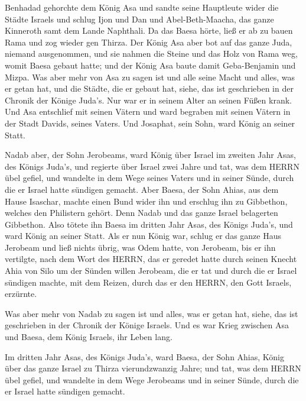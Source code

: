  Benhadad gehorchte dem König Asa und sandte seine
Hauptleute wider die Städte Israels und schlug Ijon und Dan und
Abel-Beth-Maacha, das ganze Kinneroth samt dem Lande Naphthali.
 Da das Baesa hörte, ließ er ab zu bauen Rama und zog
wieder gen Thirza.  Der König Asa aber bot auf das ganze
Juda, niemand ausgenommen, und sie nahmen die Steine und das Holz von
Rama weg, womit Baesa gebaut hatte; und der König Asa baute damit
Geba-Benjamin und Mizpa.  Was aber mehr von Asa zu sagen
ist und alle seine Macht und alles, was er getan hat, und die Städte,
die er gebaut hat, siehe, das ist geschrieben in der Chronik der Könige
Juda's. Nur war er in seinem Alter an seinen Füßen krank. 
Und Asa entschlief mit seinen Vätern und ward begraben mit seinen Vätern
in der Stadt Davids, seines Vaters. Und Josaphat, sein Sohn, ward König
an seiner Statt.

 Nadab aber, der Sohn Jerobeams, ward König über Israel im
zweiten Jahr Asas, des Königs Juda's, und regierte über Israel zwei
Jahre  und tat, was dem HERRN übel gefiel, und wandelte in
dem Wege seines Vaters und in seiner Sünde, durch die er Israel hatte
sündigen gemacht.  Aber Baesa, der Sohn Ahias, aus dem
Hause Isaschar, machte einen Bund wider ihn und erschlug ihn zu
Gibbethon, welches den Philistern gehört. Denn Nadab und das ganze
Israel belagerten Gibbethon.  Also tötete ihn Baesa im
dritten Jahr Asas, des Königs Juda's, und ward König an seiner Statt.
 Als er nun König war, schlug er das ganze Haus Jerobeam
und ließ nichts übrig, was Odem hatte, von Jerobeam, bis er ihn
vertilgte, nach dem Wort des HERRN, das er geredet hatte durch seinen
Knecht Ahia von Silo  um der Sünden willen Jerobeam, die er
tat und durch die er Israel sündigen machte, mit dem Reizen, durch das
er den HERRN, den Gott Israels, erzürnte.

 Was aber mehr von Nadab zu sagen ist und alles, was er
getan hat, siehe, das ist geschrieben in der Chronik der Könige Israels.
 Und es war Krieg zwischen Asa und Baesa, dem König
Israels, ihr Leben lang.

 Im dritten Jahr Asas, des Königs Juda's, ward Baesa, der
Sohn Ahias, König über das ganze Israel zu Thirza vierundzwanzig Jahre;
 und tat, was dem HERRN übel gefiel, und wandelte in dem
Wege Jerobeams und in seiner Sünde, durch die er Israel hatte sündigen
gemacht.

